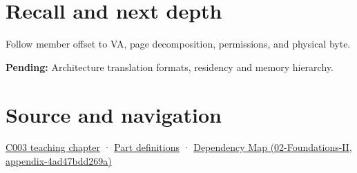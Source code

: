\section{Recall and next depth}\label{appendix-18ee4f913c3c-recall-and-next-depth}

Follow member offset to VA, page decomposition, permissions, and physical byte.

\textbf{Pending:} Architecture translation formats, residency and memory hierarchy.

\section{Source and navigation}\label{appendix-18ee4f913c3c-source-and-navigation}

\href{Continuous\%20Notes/Computing\%20Foundations\%20-\%20From\%20Bits\%20to\%20C++\%20and\%20Systems\%20APIs\#Where\%20the\%20bytes\%20live}{C003 teaching chapter} · \hyperref[appendix-fd090d982a15-m003---parts-41-60]{Part definitions} · \href{../02-Foundations-II/main.pdf\#nameddest=appendix-4ad47bdd269a}{Dependency Map (02-Foundations-II, appendix-4ad47bdd269a)}
